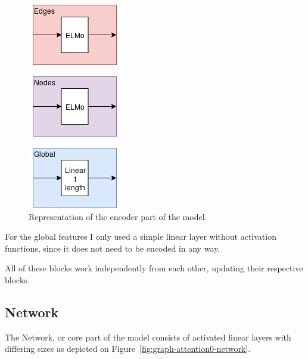 \begin{figure}[!ht]
	\centering
	\includegraphics[scale=0.5]{figures/GA0_encoder.png}
	\caption{Representation of the encoder part of the model.}
	\label{fig:graph-attention0-encoder}
\end{figure}

For the global features I only used a simple linear layer without activation functions, since it does not need to be encoded in any way.

All of these blocks work independently from each other, updating their respective blocks.

\subsection{Network}

The Network, or core part of the model consists of activated linear layers with differing sizes as depicted on Figure~\ref{fig:graph-attention0-network}.

